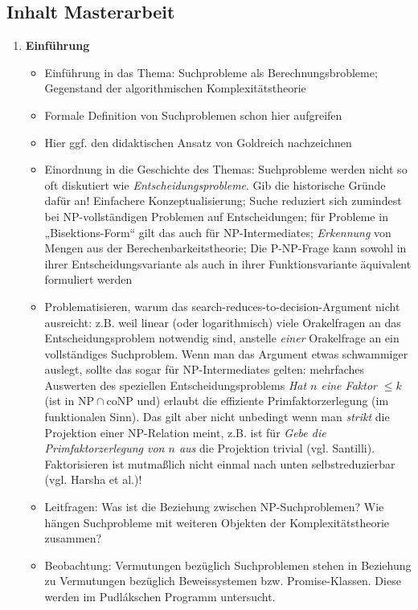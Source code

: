 \documentclass[nofonts]{uebung}
\def\NP{\ensuremath{\mathrm{NP}}}
\def\coNP{\ensuremath{\mathrm{coNP}}}
\begin{document}
\subsection*{Inhalt Masterarbeit}
\begin{enumerate}[label*=\arabic*.]
    \item \textbf{Einführung}
        \begin{itemize}
            \item Einführung in das Thema: Suchprobleme als Berechnungsbrobleme; Gegenstand der algorithmischen Komplexitätstheorie
            \item Formale Definition von Suchproblemen schon hier aufgreifen
            \item Hier ggf. den didaktischen Ansatz von Goldreich nachzeichnen
            \item Einordnung in die Geschichte des Themas: Suchprobleme werden nicht so oft diskutiert wie \emph{Entscheidungsprobleme}. Gib die historische Gründe dafür an! Einfachere Konzeptualisierung; Suche reduziert sich zumindest bei NP-vollständigen Problemen auf Entscheidungen; für Probleme in „Bisektions-Form“ gilt das auch für NP-Intermediates; \emph{Erkennung} von Mengen aus der Berechenbarkeitstheorie; Die P-NP-Frage kann sowohl in ihrer Entscheidungsvariante als auch in ihrer Funktionsvariante äquivalent formuliert werden
            \item Problematisieren, warum das search-reduces-to-decision-Argument nicht ausreicht: z.B. weil linear (oder logarithmisch) viele Orakelfragen an das Entscheidungsproblem notwendig sind, anstelle \emph{einer} Orakelfrage an ein vollständiges Suchproblem. Wenn man das Argument etwas schwammiger auslegt, sollte das sogar für NP-Intermediates gelten: mehrfaches Auswerten des speziellen Entscheidungsproblems \emph{Hat $n$ eine Faktor $\leq k$} (ist in $\NP\cap\coNP$ und) erlaubt die effiziente Primfaktorzerlegung (im funktionalen Sinn). Das gilt aber nicht unbedingt wenn man \emph{strikt} die Projektion einer NP-Relation meint, z.B. ist für \emph{Gebe die Primfaktorzerlegung von $n$ aus} die Projektion trivial (vgl. Santilli). Faktorisieren ist mutmaßlich nicht einmal nach unten selbstreduzierbar (vgl. Harsha et al.)!
            \item Leitfragen: Was ist die Beziehung zwischen NP-Suchproblemen? Wie hängen Suchprobleme mit weiteren Objekten der Komplexitätstheorie zusammen?
            \item Beobachtung: Vermutungen bezüglich Suchproblemen stehen in Beziehung zu Vermutungen bezüglich Beweissystemen bzw. Promise-Klassen. Diese werden im Pudlákschen Programm untersucht.

\end{itemize}
\end{enumerate}
\end{document}
